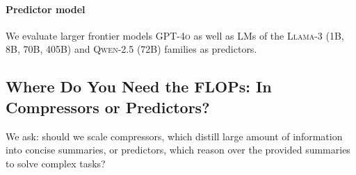 \documentclass{article} %
\begin{document}
\paragraph*{Predictor model} 
We evaluate larger frontier models \textsc{GPT-4o} \citep{openai2024gpt4ocard} as well as LMs of the \textsc{Llama-3} (1B, 8B, 70B, 405B) and \textsc{Qwen-2.5} (72B) families as predictors. %


\subsection{Where Do You Need the FLOPs: In Compressors or Predictors?}
\label{sec:compressor-predictor-intelligence}

We ask: should we scale compressors, which distill large amount of information into concise summaries, or predictors, which reason over the provided summaries to solve complex tasks?
\end{document}

